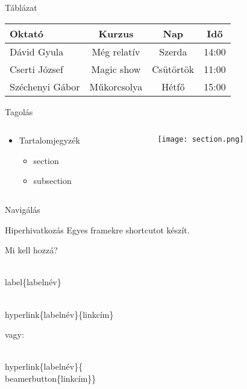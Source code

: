 \documentclass[11pt]{beamer}
\begin{document}
\begin{frame}{Táblázat}
	\begin{table}
		\begin{tabular}{l | c | c | c}
		Oktató & Kurzus & Nap & Idő \\
		\hline \hline
		Dávid Gyula & Még relatív & Szerda & 14:00 \\
		\hline
		Cserti József & Magic show & Csütörtök & 11:00 \\
		\hline
		Széchenyi Gábor & Műkorcsolya & Hétfő & 15:00 \\
		\end{tabular}
	\end{table}
\end{frame}

\begin{frame}{Tagolás}
\begin{columns}

	\begin{column}{0.5\textwidth}
		\begin{itemize}
			\item Tartalomjegyzék
			\begin{itemize}
				\item section
				\item subsection
			\end{itemize}
		\end{itemize}
	\end{column}

	\begin{column}{0.5\textwidth}
		\centering
		\texttt{[image: section.png]}
	\end{column}

\end{columns}
\end{frame}

\begin{frame}{Navigálás}
\begin{block}{Hiperhivatkozás}
Egyes framekre shortcutot készít.
\end{block}
\alert{Mi kell hozzá?}
\begin{semiverbatim}
\\label\{labelnév\}

\\hyperlink\{labelnév\}\{linkcím\}

\alert{vagy:}

\\hyperlink\{labelnév\}\{\\beamerbutton\{linkcím\}\}

\end{semiverbatim}
\begin{example}
\hyperlink{parancsok}{}
\end{example}
\end{frame}
\end{document}
